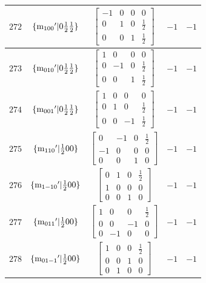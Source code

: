\documentclass[fleqn,8pt]{jsarticle}
\begin{document}
\begin{longtable}{ccccc}
$ 272 $ & $ \{{\rm m}_{100}{}'|0 \frac{1}{2} \frac{1}{2}\} $ & $ \begin{bmatrix} -1 & 0 & 0 & 0 \\ 0 & 1 & 0 & \frac{1}{2} \\ 0 & 0 & 1 & \frac{1}{2} \end{bmatrix} $ & $ -1 $ & $ -1 $ \\ \hline
$ 273 $ & $ \{{\rm m}_{010}{}'|0 \frac{1}{2} \frac{1}{2}\} $ & $ \begin{bmatrix} 1 & 0 & 0 & 0 \\ 0 & -1 & 0 & \frac{1}{2} \\ 0 & 0 & 1 & \frac{1}{2} \end{bmatrix} $ & $ -1 $ & $ -1 $ \\ \hline
$ 274 $ & $ \{{\rm m}_{001}{}'|0 \frac{1}{2} \frac{1}{2}\} $ & $ \begin{bmatrix} 1 & 0 & 0 & 0 \\ 0 & 1 & 0 & \frac{1}{2} \\ 0 & 0 & -1 & \frac{1}{2} \end{bmatrix} $ & $ -1 $ & $ -1 $ \\ \hline
$ 275 $ & $ \{{\rm m}_{110}{}'|\frac{1}{2} 0 0\} $ & $ \begin{bmatrix} 0 & -1 & 0 & \frac{1}{2} \\ -1 & 0 & 0 & 0 \\ 0 & 0 & 1 & 0 \end{bmatrix} $ & $ -1 $ & $ -1 $ \\ \hline
$ 276 $ & $ \{{\rm m}_{1-10}{}'|\frac{1}{2} 0 0\} $ & $ \begin{bmatrix} 0 & 1 & 0 & \frac{1}{2} \\ 1 & 0 & 0 & 0 \\ 0 & 0 & 1 & 0 \end{bmatrix} $ & $ -1 $ & $ -1 $ \\ \hline
$ 277 $ & $ \{{\rm m}_{011}{}'|\frac{1}{2} 0 0\} $ & $ \begin{bmatrix} 1 & 0 & 0 & \frac{1}{2} \\ 0 & 0 & -1 & 0 \\ 0 & -1 & 0 & 0 \end{bmatrix} $ & $ -1 $ & $ -1 $ \\ \hline
$ 278 $ & $ \{{\rm m}_{01-1}{}'|\frac{1}{2} 0 0\} $ & $ \begin{bmatrix} 1 & 0 & 0 & \frac{1}{2} \\ 0 & 0 & 1 & 0 \\ 0 & 1 & 0 & 0 \end{bmatrix} $ & $ -1 $ & $ -1 $ \\ \hline

\end{longtable}
\end{document}
